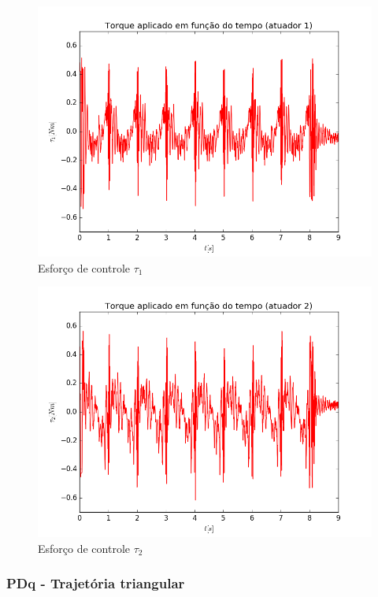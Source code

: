 \documentclass[]{politex}
\begin{document}
\begin{multicols}{2}
\begin{figure}[H]
	\centering
	\includegraphics[scale=0.39]{../../../Experimental/Aquisicoes/SMCx_circulo/tau1.png}  
	\caption{Esforço de controle $\tau_1$}
	\label{fig:SMCx_circulo_tau1}
\end{figure}
\begin{figure}[H]
	\centering
	\includegraphics[scale=0.39]{../../../Experimental/Aquisicoes/SMCx_circulo/tau2.png}  
	\caption{Esforço de controle $\tau_2$}
	\label{fig:SMCx_circulo_tau2}
\end{figure}
\end{multicols}

\subsubsection{PDq - Trajetória triangular}
\end{document}
